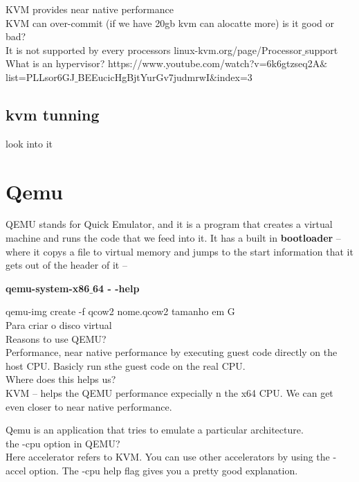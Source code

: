 \documentclass[11pt, a4paper, oneside]{article}
\theoremstyle{definition}
\begin{document}
KVM provides near native performance\\
KVM can over-commit (if we have 20gb kvm can alocatte more) is it good or bad?\\
It is not supported by every processors linux-kvm.org/page/Processor$\_$support\\

What is an hypervisor? https://www.youtube.com/watch?v=6k6gtzseq2A$\&$list=PLLsor6GJ$\_$BEEucicHgBjtYurGv7judmrwI$\&$index=3

\subsection{kvm tunning}

look into it

\vfill
\pagebreak
\section{Qemu}

QEMU stands for Quick Emulator, and it is a program that creates a virtual machine and runs the code that we feed into it. It has a built in \textbf{bootloader} -- where it copys a file to virtual memory and jumps to the start information that it gets out of the header of it -- 

\Large\textbf{qemu-system-x86$\_$64 - -help}

qemu-img create -f qcow2 nome.qcow2 tamanho em G\\
Para criar o disco virtual\\

Reasons to use QEMU?\\
Performance, near native performance by executing guest code directly on the host CPU. Basicly run sthe guest code on the real CPU.\\
Where does this helps us?\\
KVM -- helps the QEMU performance expecially n the x64 CPU. We can get even closer to near native performance. 


Qemu is an application that tries to emulate a particular architecture.\\

the -cpu option in QEMU?\\

Here accelerator refers to KVM. You can use other accelerators by using the -accel option. The -cpu help flag gives you a pretty good explanation.\\
\end{document}

